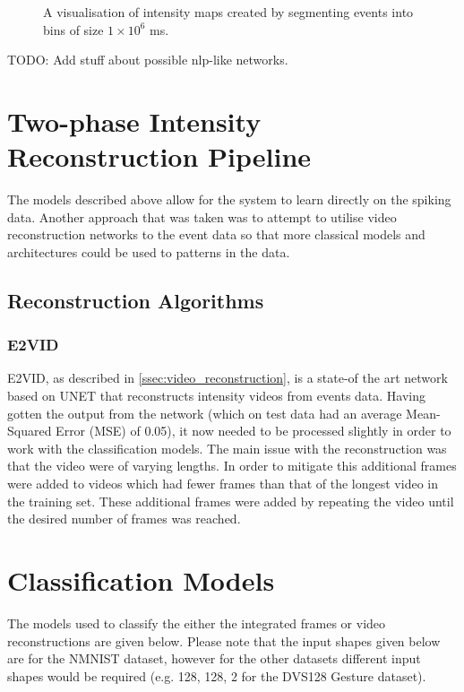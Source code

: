 \begin{figure}[htb]
    \caption{A visualisation of intensity maps created by segmenting events into bins of size $ 1 \times 10^6 $ ms.}%
    \label{fig:nmnist_spikes_to_intensity_map}%
\end{figure}

\color{red} TODO: Add stuff about possible nlp-like networks. \color{black}


\section{Two-phase Intensity Reconstruction Pipeline}

The models described above allow for the system to learn directly on the spiking data. Another approach that was taken was to attempt to utilise video reconstruction networks to the event data so that more classical models and architectures could be used to patterns in the data.

\subsection{Reconstruction Algorithms}

\subsubsection{E2VID}

E2VID, as described in \cref{ssec:video_reconstruction}, is a state-of the art network based on UNET that reconstructs intensity videos from events data. Having gotten the output from the network (which on test data had an average Mean-Squared Error (MSE) of 0.05), it now needed to be processed slightly in order to work with the classification models. The main issue with the reconstruction was that the video were of varying lengths. In order to mitigate this additional frames were added to videos which had fewer frames than that of the longest video in the training set. These additional frames were added by repeating the video until the desired number of frames was reached.

\color{black}

\section{Classification Models}

The models used to classify the either the integrated frames or video reconstructions are given below. Please note that the input shapes given below are for the NMNIST dataset, however for the other datasets different input shapes would be required (e.g. {128, 128, 2} for the DVS128 Gesture dataset).

